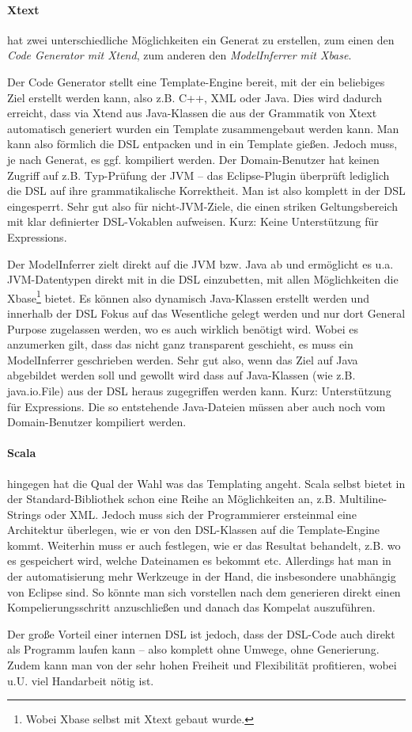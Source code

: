 \paragraph{Xtext} hat zwei unterschiedliche Möglichkeiten ein
Generat zu erstellen, zum einen den \emph{Code Generator mit Xtend},
zum anderen den \emph{ModelInferrer mit Xbase}.

Der Code Generator stellt eine Template-Engine bereit, mit der
ein beliebiges Ziel erstellt werden kann, also z.B. C++, XML oder Java.
Dies wird dadurch erreicht, dass via Xtend aus Java-Klassen die aus der
Grammatik von Xtext automatisch generiert wurden ein Template zusammengebaut
werden kann. Man kann also förmlich die DSL entpacken und in ein Template
gießen.
Jedoch muss, je nach Generat, es ggf. kompiliert werden. Der
Domain-Benutzer hat keinen Zugriff auf z.B. Typ-Prüfung der JVM --
das Eclipse-Plugin überprüft lediglich die DSL auf ihre
grammatikalische Korrektheit. Man ist also komplett in der DSL eingesperrt.
Sehr gut also für nicht-JVM-Ziele, die einen striken Geltungsbereich mit
klar definierter DSL-Vokablen aufweisen. Kurz: Keine Unterstützung für
Expressions.

Der ModelInferrer zielt direkt auf die JVM bzw. Java ab und ermöglicht es
u.a. JVM-Datentypen direkt mit in die DSL einzubetten, mit allen Möglichkeiten
die Xbase\footnote{Wobei Xbase selbst mit Xtext gebaut wurde.}
bietet. Es können also dynamisch Java-Klassen erstellt werden und innerhalb
der DSL Fokus auf das Wesentliche gelegt werden und nur dort General Purpose
zugelassen werden, wo es auch wirklich benötigt wird.
Wobei es anzumerken gilt, dass das nicht ganz transparent geschieht,
es muss ein ModelInferrer geschrieben werden.
Sehr gut also, wenn das Ziel auf Java abgebildet werden soll und gewollt wird
dass auf Java-Klassen (wie z.B. java.io.File) aus der DSL heraus
zugegriffen werden kann. Kurz: Unterstützung für Expressions.
Die so entstehende Java-Dateien müssen aber auch noch vom Domain-Benutzer
kompiliert werden.\cite{xtext}

\paragraph{Scala} hingegen hat die Qual der Wahl was das Templating angeht.
Scala selbst bietet in der Standard-Bibliothek schon
eine Reihe an Möglichkeiten an,
z.B. Multiline-Strings oder XML. Jedoch muss sich der Programmierer ersteinmal
eine Architektur überlegen, wie er von den DSL-Klassen auf die Template-Engine
kommt. Weiterhin muss er auch festlegen, wie er das Resultat behandelt,
z.B. wo es gespeichert wird, welche Dateinamen es bekommt etc.
Allerdings hat man in der automatisierung mehr Werkzeuge in der Hand,
die insbesondere unabhängig von Eclipse sind. So könnte man sich vorstellen
nach dem generieren direkt einen Kompelierungsschritt anzuschließen und
danach das Kompelat auszuführen.

Der große Vorteil einer internen DSL ist jedoch, dass der DSL-Code auch
direkt als Programm laufen kann -- also komplett ohne Umwege, ohne Generierung.
Zudem kann man von der sehr hohen Freiheit und Flexibilität profitieren,
wobei u.U. viel Handarbeit nötig ist.

